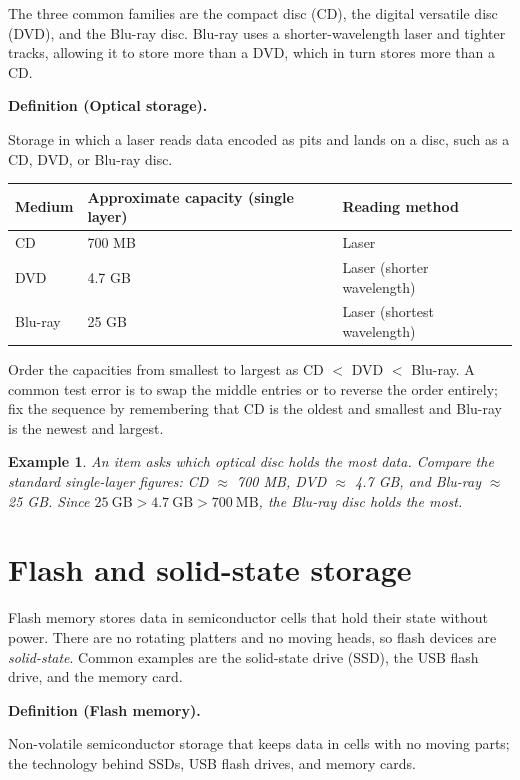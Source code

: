 \documentclass[11pt]{article}
\newtheorem{example}{Example}[section]
\newenvironment{definitionbox}[1]{%
  \par\noindent\textbf{Definition (#1).}\ \itshape
}{\par\vspace{0.3em}}
\begin{document}
The three common families are the compact disc (CD), the digital versatile
disc (DVD), and the Blu-ray disc. Blu-ray uses a shorter-wavelength laser and
tighter tracks, allowing it to store more than a DVD, which in turn stores
more than a CD.

\begin{definitionbox}{Optical storage}
Storage in which a laser reads data encoded as pits and lands on a disc, such
as a CD, DVD, or Blu-ray disc.
\end{definitionbox}

\begin{center}
\begin{tabular}{lll}
\toprule
\textbf{Medium} & \textbf{Approximate capacity (single layer)} &
\textbf{Reading method}\\
\midrule
CD & 700 MB & Laser\\
DVD & 4.7 GB & Laser (shorter wavelength)\\
Blu-ray & 25 GB & Laser (shortest wavelength)\\
\bottomrule
\end{tabular}
\end{center}

Order the capacities from smallest to largest as CD $<$ DVD $<$ Blu-ray.
A common test error is to swap the middle entries or to reverse the order
entirely; fix the sequence by remembering that CD is the oldest and smallest
and Blu-ray is the newest and largest.

\begin{example}
An item asks which optical disc holds the most data. Compare the standard
single-layer figures: CD $\approx$ 700 MB, DVD $\approx$ 4.7 GB, and Blu-ray
$\approx$ 25 GB. Since $25\ \text{GB} > 4.7\ \text{GB} > 700\ \text{MB}$, the
Blu-ray disc holds the most.
\end{example}

\section{Flash and solid-state storage}
Flash memory stores data in semiconductor cells that hold their state without
power. There are no rotating platters and no moving heads, so flash devices
are \emph{solid-state}. Common examples are the solid-state drive (SSD), the
USB flash drive, and the memory card.

\begin{definitionbox}{Flash memory}
Non-volatile semiconductor storage that keeps data in cells with no moving
parts; the technology behind SSDs, USB flash drives, and memory cards.
\end{definitionbox}
\end{document}
